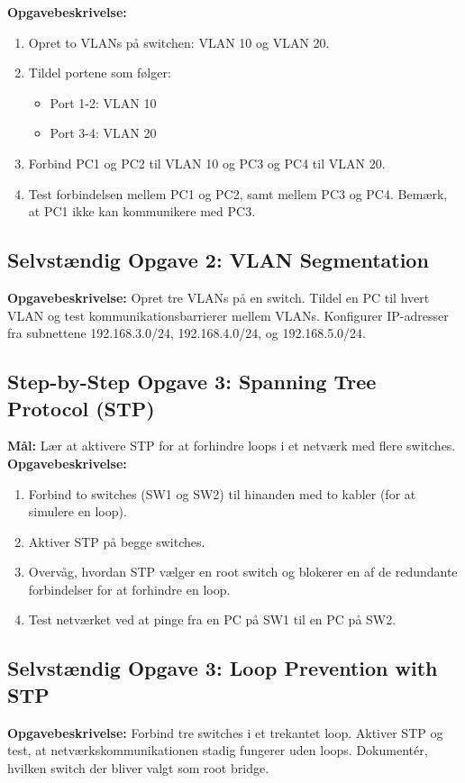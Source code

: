 \textbf{Opgavebeskrivelse:}
\begin{enumerate}
	\item Opret to VLANs på switchen: VLAN 10 og VLAN 20.
	\item Tildel portene som følger:
	\begin{itemize}
		\item Port 1-2: VLAN 10
		\item Port 3-4: VLAN 20
	\end{itemize}
	\item Forbind PC1 og PC2 til VLAN 10 og PC3 og PC4 til VLAN 20.
	\item Test forbindelsen mellem PC1 og PC2, samt mellem PC3 og PC4. Bemærk, at PC1 ikke kan kommunikere med PC3.
\end{enumerate}

\subsection*{Selvstændig Opgave 2: VLAN Segmentation}
\textbf{Opgavebeskrivelse:} Opret tre VLANs på en switch. Tildel en PC til hvert VLAN og test kommunikationsbarrierer mellem VLANs. Konfigurer IP-adresser fra subnettene 192.168.3.0/24, 192.168.4.0/24, og 192.168.5.0/24.

\subsection*{Step-by-Step Opgave 3: Spanning Tree Protocol (STP)}
\textbf{Mål:} Lær at aktivere STP for at forhindre loops i et netværk med flere switches.
\newline\newline\noindent
\textbf{Opgavebeskrivelse:}
\begin{enumerate}
	\item Forbind to switches (SW1 og SW2) til hinanden med to kabler (for at simulere en loop).
	\item Aktiver STP på begge switches.
	\item Overvåg, hvordan STP vælger en root switch og blokerer en af de redundante forbindelser for at forhindre en loop.
	\item Test netværket ved at pinge fra en PC på SW1 til en PC på SW2.
\end{enumerate}

\subsection*{Selvstændig Opgave 3: Loop Prevention with STP}
\textbf{Opgavebeskrivelse:} Forbind tre switches i et trekantet loop. Aktiver STP og test, at netværkskommunikationen stadig fungerer uden loops. Dokumentér, hvilken switch der bliver valgt som root bridge.


